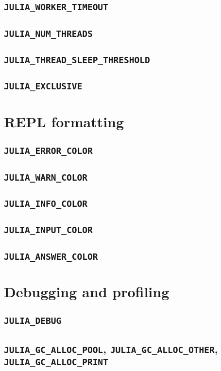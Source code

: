    \subsection{\texttt{JULIA\_WORKER\_TIMEOUT}}
    \subsection{\texttt{JULIA\_NUM\_THREADS}}
    \subsection{\texttt{JULIA\_THREAD\_SLEEP\_THRESHOLD}}
    \subsection{\texttt{JULIA\_EXCLUSIVE}}
    \section{REPL formatting}
    \subsection{\texttt{JULIA\_ERROR\_COLOR}}
    \subsection{\texttt{JULIA\_WARN\_COLOR}}
    \subsection{\texttt{JULIA\_INFO\_COLOR}}
    \subsection{\texttt{JULIA\_INPUT\_COLOR}}
    \subsection{\texttt{JULIA\_ANSWER\_COLOR}}
    \section{Debugging and profiling}
    \subsection{\texttt{JULIA\_DEBUG}}
    \subsection{\texttt{JULIA\_GC\_ALLOC\_POOL}, \texttt{JULIA\_GC\_ALLOC\_OTHER}, \texttt{JULIA\_GC\_ALLOC\_PRINT}}
